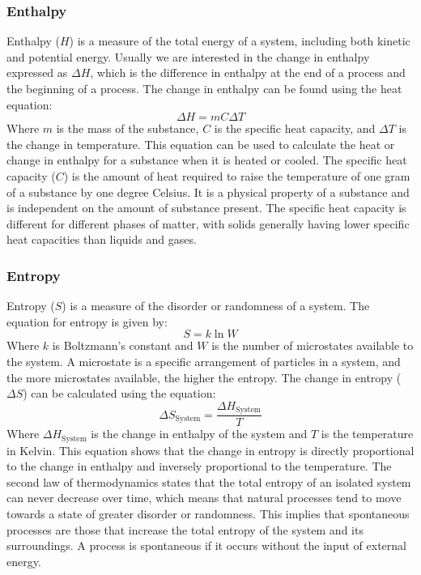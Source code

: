 \subsubsection{Enthalpy}\label{sec:enthalpy}
Enthalpy ($H$) is a measure of the total energy of a system, including both kinetic and potential energy. Usually we are interested in the change in enthalpy expressed as $\Delta H$, which is the difference in enthalpy at the end of a process and the beginning of a process. The change in enthalpy can be found using the heat equation:
\begin{equation}\label{eq:heat}
    \Delta H = mC\Delta T
\end{equation}
Where $m$ is the mass of the substance, $C$ is the specific heat capacity, and $\Delta T$ is the change in temperature. This equation can be used to calculate the heat or change in enthalpy for a substance when it is heated or cooled.
The specific heat capacity ($C$) is the amount of heat required to raise the temperature of one gram of a substance by one degree Celsius. It is a physical property of a substance and is independent on the amount of substance present. The specific heat capacity is different for different phases of matter, with solids generally having lower specific heat capacities than liquids and gases. 
\subsubsection{Entropy}\label{sec:entropy}
Entropy ($S$) is a measure of the disorder or randomness of a system. The equation for entropy is given by:
\begin{equation}\label{eq:entropy}
    S = k \ln{W}
\end{equation}
Where $k$ is Boltzmann's constant and $W$ is the number of microstates available to the system. A microstate is a specific arrangement of particles in a system, and the more microstates available, the higher the entropy. The change in entropy ($\Delta S$) can be calculated using the equation:
\begin{equation}\label{eq:deltaS}
    \Delta S_\text{System} = \frac{\Delta H_\text{System}}{T}
\end{equation}
Where $\Delta H_\text{System}$ is the change in enthalpy of the system and $T$ is the temperature in Kelvin. This equation shows that the change in entropy is directly proportional to the change in enthalpy and inversely proportional to the temperature. The second law of thermodynamics states that the total entropy of an isolated system can never decrease over time, which means that natural processes tend to move towards a state of greater disorder or randomness. This implies that spontaneous processes are those that increase the total entropy of the system and its surroundings.
A process is spontaneous if it occurs without the input of external energy. 

